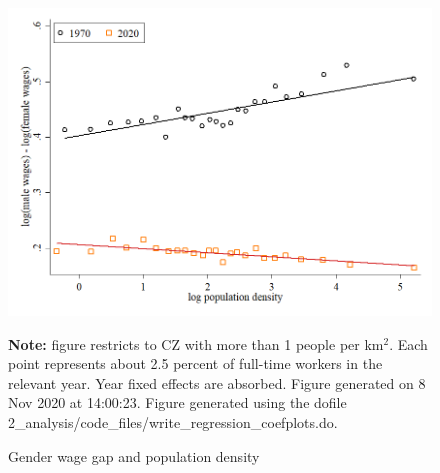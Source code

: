 \begin{figure}[!h]
\centering
\caption{Gender wage gap and population density}
\includegraphics[width=1\textwidth]{../2_analysis/output/figures/l_czone_density_1970_vs_2020_level}
\par \begin{minipage}[h]{\textwidth}{\tiny\textbf{Note:} figure restricts to CZ with more than 1 people per km$^2$. Each point represents about 2.5 percent of full-time workers in the relevant year. Year fixed effects are absorbed. Figure generated on  8 Nov 2020 at 14:00:23. Figure generated using the dofile 2\_analysis/code\_files/write\_regression\_coefplots.do.}\end{minipage}
\end{figure}
